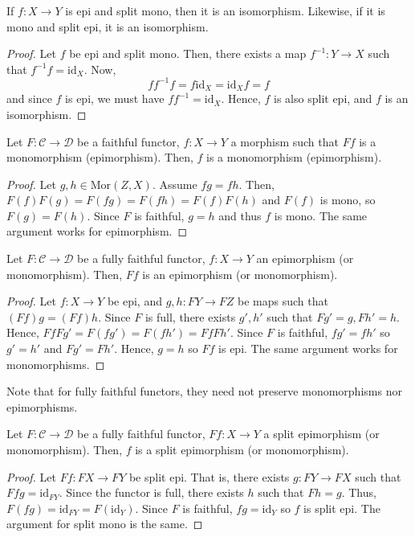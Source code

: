 \documentclass[12pt,reqno]{amsart}
\numberwithin{theorem}{section}
\theoremstyle{definition}
\theoremstyle{remark}
\numberwithin{equation}{section}
\newcommand{\cC}{\mathcal{C}}
\newcommand{\cD}{\mathcal{D}}
\theoremstyle{definition}
\newcommand{\id}{\mathrm{id}}
\newcommand{\Mor}{\mathrm{Mor}}
\begin{document}
\begin{proposition}
    If $f:X\rightarrow Y$ is epi and split mono, then it is an isomorphism. Likewise, if it is mono and split epi, it is an isomorphism.
\end{proposition}
\begin{proof}
    Let $f$ be epi and split mono. Then, there exists a map $f^{-1}:Y\rightarrow X$ such that $f^{-1}f = \id_X$. Now, $$ff^{-1}f =f \id_X = \id_X f = f$$
    and since $f$ is epi, we must have $ff^{-1}=\id_X$. Hence, $f$ is also split epi, and $f$ is an isomorphism.
\end{proof}
\begin{proposition}
    Let $F:\cC \rightarrow \cD$ be a faithful functor, $f:X\rightarrow Y$ a morphism such that $Ff$ is a monomorphism (epimorphism). Then, $f$ is a monomorphism (epimorphism). 
\end{proposition}
\begin{proof}
    Let $g,h \in \Mor(Z,X)$. Assume $fg=fh$. Then, $F(f)F(g)=F(fg)=F(fh)=F(f)F(h)$ and $F(f)$ is mono, so $F(g)=F(h)$. Since $F$ is faithful, $g=h$ and thus $f$ is mono. The same argument works for epimorphism.
\end{proof}
\begin{proposition}
     Let $F:\cC \rightarrow \cD$ be a fully faithful functor, $f:X\rightarrow Y$ an epimorphism (or monomorphism). Then, $Ff$ is an epimorphism (or monomorphism). 
\end{proposition}
\begin{proof}
    Let $f:X\rightarrow Y$ be epi, and $g,h:FY \rightarrow FZ$ be maps such that $(Ff)g=(Ff)h$. Since $F$ is full, there exists $g',h'$ such that $Fg' = g, Fh' = h$. Hence, $FfFg'=F(fg')=F(fh')=FfFh'$. Since $F$ is faithful, $fg'=fh'$ so $g'=h'$ and $Fg'=Fh'$. Hence, $g=h$ so $Ff$ is epi. The same argument works for monomorphisms.
\end{proof}
Note that for fully faithful functors, they need not preserve monomorphisms nor epimorphisms.
\begin{proposition}
     Let $F:\cC \rightarrow \cD$ be a fully faithful functor, $Ff:X\rightarrow Y$ a split epimorphism (or monomorphism). Then, $f$ is a split epimorphism (or monomorphism).
\end{proposition}
\begin{proof}
    Let $Ff:FX\rightarrow FY$ be split epi. That is, there exists $g:FY \rightarrow FX$ such that $Ff g = \id_{FY}$. Since the functor is full, there exists $h$ such that $Fh = g$. Thus, $F(fg)= \id_{FY} = F(\id_{Y})$. Since $F$ is faithful, $fg=\id_{Y}$ so $f$ is split epi. The argument for split mono is the same.
\end{proof}
\end{document}
